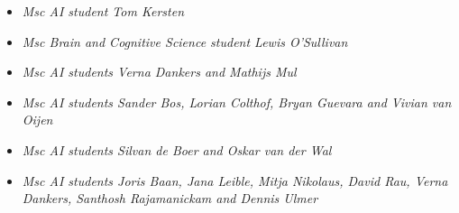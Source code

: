 {{{{{{{{{
{\begin{itemize}
  \item[] \textit{Msc AI student Tom Kersten}
\end{itemize}}}


{
{\begin{itemize}
  \item[] \textit{Msc Brain and Cognitive Science student Lewis O'Sullivan}
\end{itemize}}}

{
{\begin{itemize}
  \item[] \textit{Msc AI students Verna Dankers and Mathijs Mul}
\end{itemize}}}

{
{\begin{itemize}
  \item[] \textit{Msc AI students Sander Bos, Lorian Colthof, Bryan Guevara and Vivian van Oijen}
\end{itemize}}}

{
{\begin{itemize}
  \item[] \textit{Msc AI students Silvan de Boer and Oskar van der Wal}
\end{itemize}}}

{
{\begin{itemize}
  \item[] \textit{Msc AI students Joris Baan, Jana Leible, Mitja Nikolaus, David Rau, Verna Dankers, Santhosh Rajamanickam and Dennis Ulmer}
\end{itemize}}}

}}}}}}}}

